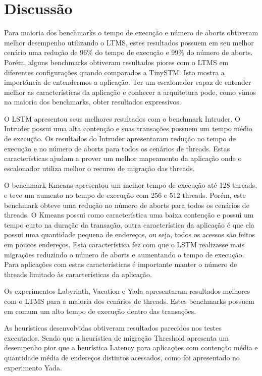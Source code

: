 \documentclass[diss,capa]{texufpel}
\begin{document}
\section{Discussão}

Para maioria dos benchmarks o tempo de execução e número de aborts obtiveram melhor desempenho utilizando o LTMS, estes resultados possuem em seu melhor cenário uma redução de 96\% do tempo de execução e 99\% do número de aborts. Porém, alguns benchmarks obtiveram resultados piores com o LTMS em diferentes configurações quando comparados a TinySTM. Isto mostra a importância de entendermos a aplicação. Ter um escalonador capaz de entender melhor as características da aplicação e conhecer a arquitetura pode, como vimos na maioria dos benchmarks, obter resultados expressivos.

O LSTM apresentou seus melhores resultados com o benchmark Intruder. O Intruder possui uma alta contenção e suas transações possuem um tempo médio de execução. Os resultados do Intruder apresentaram redução no tempo de execução e no número de aborts para todos os cenários de threads. Estas características ajudam a prover um melhor mapeamento da aplicação onde o escalonador utiliza melhor o recurso de migração das threads.

O benchmark Kmeans apresentou um melhor tempo de execução até 128 threads, e teve um aumento no tempo de execução com 256 e 512 threads. Porém, este benchmark obteve uma redução no número de aborts para todos os cenários de threads. O Kmeans possui como característica uma baixa contenção e possui um tempo curto na duração da transação, outra característica da aplicação é que ela possui uma quantidade pequena de endereços, ou seja, todos os acessos são feitos em poucos endereços. Esta característica fez com que o LSTM realizasse mais migrações reduzindo o número de aborts e aumentando o tempo de execução. Para aplicações com estas características é importante manter o número de threads limitado às características da aplicação.

Os experimentos Labyrinth, Vacation e Yada apresentaram resultados melhores com o LTMS para a maioria dos cenários de threads. Estes benchmarks possuem em comum um alto tempo de execução dentro das transações.

As heurísticas desenvolvidas obtiveram resultados parecidos nos testes executados. Sendo que a heurística de migração Threshold apresenta um desempenho pior que a heurística Latency para aplicações com contenção média e quantidade média de endereços distintos acessados, como foi apresentado no experimento Yada.
\end{document}
